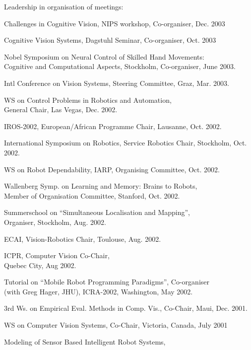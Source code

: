 \documentclass{article}
\begin{document}
\begin{cv}
\begin{cvlist}{Leadership in organisation of meetings:}
\item Challenges in Cognitive Vision, NIPS workshop, Co-organiser,
  \cftdotfill{\cftdotsep} Dec. 2003
\item Cognitive Vision Systems, Dagstuhl Seminar, Co-organiser,
  \cftdotfill{\cftdotsep} Oct. 2003
\item Nobel Symposium on Neural Control of Skilled Hand
  Movements:\\ Cognitive and Computational Aspects, Stockholm,
  Co-organiser, \cftdotfill{\cftdotsep} June 2003.
\item Intl Conference on Vision Systems, Steering Committee, Graz,
  \cftdotfill{\cftdotsep} Mar. 2003.
\item WS on Control Problems in Robotics and Automation, \\General
  Chair, Las Vegas, \cftdotfill{\cftdotsep}Dec. 2002.
\item IROS-2002, European/African Programme Chair, Lausanne,
  \cftdotfill{\cftdotsep} Oct. 2002.
\item International Symposium on Robotics, Service Robotics Chair,
  Stockholm, \cftdotfill{\cftdotsep} Oct. 2002.
\item WS on Robot Dependability, IARP, Organising Committee,
  \cftdotfill{\cftdotsep} Oct. 2002.
\item Wallenberg Symp. on Learning and Memory: Brains to Robots,\\
  Member of Organisation Committee, Stanford, \cftdotfill{\cftdotsep} Oct. 2002.
\item Summerschool on ``Simultaneous Localisation and Mapping'',
  \\Organiser, Stockholm, \cftdotfill{\cftdotsep}Aug. 2002.
\item ECAI, Vision-Robotics Chair, Toulouse, \cftdotfill{\cftdotsep}
  Aug. 2002.
\item ICPR, Computer Vision Co-Chair,\\ Quebec City,
  \cftdotfill{\cftdotsep} Aug 2002.
\item Tutorial on ``Mobile Robot Programming Paradigms'',
  Co-organiser\\ (with Greg Hager, JHU), ICRA-2002, Washington,
  \cftdotfill{\cftdotsep}May 2002.
\item 3rd Ws. on Empirical Eval. Methods in Comp. Vis., Co-Chair,
  Maui, \cftdotfill{\cftdotsep} Dec. 2001.
\item WS on Computer Vision Systems, Co-Chair, Victoria,
  Canada,\cftdotfill{\cftdotsep} July 2001
\item Modeling of Sensor Based Intelligent Robot Systems,\\

\end{cvlist}
\end{cv}
\end{document}
